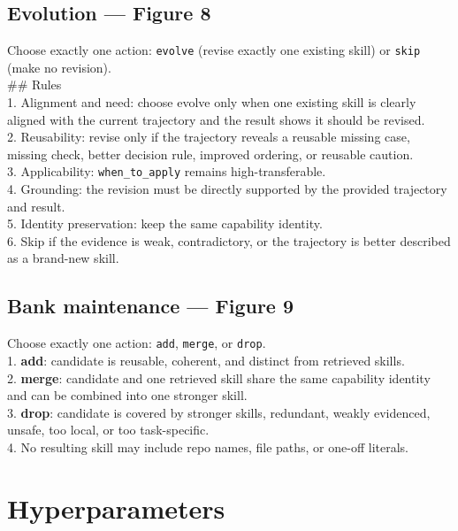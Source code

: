 \documentclass[11pt,a4paper]{article}
\begin{document}
\subsection{Evolution --- Figure 8}

\begin{promptbox}
Choose exactly one action: \texttt{evolve} (revise exactly one existing
skill) or \texttt{skip} (make no revision).\\[0.4em]
\#\# Rules\\
1. Alignment and need: choose evolve only when one existing skill is
clearly aligned with the current trajectory and the result shows it
should be revised.\\
2. Reusability: revise only if the trajectory reveals a reusable
missing case, missing check, better decision rule, improved ordering,
or reusable caution.\\
3. Applicability: \texttt{when\_to\_apply} remains high-transferable.\\
4. Grounding: the revision must be directly supported by the provided
trajectory and result.\\
5. Identity preservation: keep the same capability identity.\\
6. Skip if the evidence is weak, contradictory, or the trajectory is
better described as a brand-new skill.
\end{promptbox}

\subsection{Bank maintenance --- Figure 9}

\begin{promptbox}
Choose exactly one action: \texttt{add}, \texttt{merge}, or
\texttt{drop}.\\[0.4em]
1. \textbf{add}: candidate is reusable, coherent, and distinct from
retrieved skills.\\
2. \textbf{merge}: candidate and one retrieved skill share the same
capability identity and can be combined into one stronger skill.\\
3. \textbf{drop}: candidate is covered by stronger skills, redundant,
weakly evidenced, unsafe, too local, or too task-specific.\\
4. No resulting skill may include repo names, file paths, or one-off
literals.
\end{promptbox}

\section{Hyperparameters}
\end{document}
